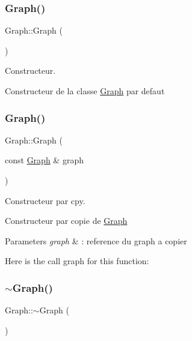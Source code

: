 \subsubsection{\texorpdfstring{Graph()}{Graph()}\hspace{0.1cm}{\footnotesize\ttfamily [1/2]}}
{\footnotesize\ttfamily Graph\+::\+Graph (\begin{DoxyParamCaption}{ }\end{DoxyParamCaption})}



Constructeur. 

Constructeur de la classe \mbox{\hyperlink{class_graph}{Graph}} par defaut \mbox{\label{class_graph_af67de98565b93f81f3766649b567e662}} 
\subsubsection{\texorpdfstring{Graph()}{Graph()}\hspace{0.1cm}{\footnotesize\ttfamily [2/2]}}
{\footnotesize\ttfamily Graph\+::\+Graph (\begin{DoxyParamCaption}\item[{const \mbox{\hyperlink{class_graph}{Graph}} \&}]{graph }\end{DoxyParamCaption})}



Constructeur par cpy. 

Constructeur par copie de \mbox{\hyperlink{class_graph}{Graph}}


\begin{DoxyParams}{Parameters}
{\em graph} & \+: reference du graph a copier \\
\hline
\end{DoxyParams}
Here is the call graph for this function\+:
\mbox{\label{class_graph_a902c5b3eacb66d60752525ab23297a95}} 
\subsubsection{\texorpdfstring{$\sim$\+Graph()}{~Graph()}}
{\footnotesize\ttfamily Graph\+::$\sim$\+Graph (\begin{DoxyParamCaption}{ }\end{DoxyParamCaption})}



